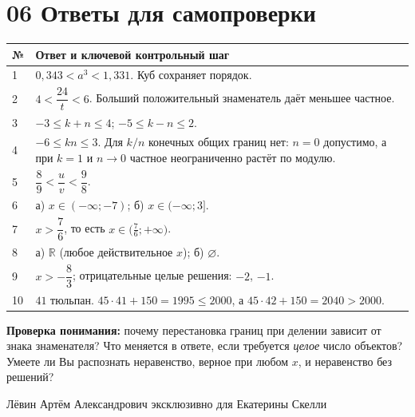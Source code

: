 \documentclass[a4paper,12pt]{article}
\newcommand{\key}[1]{\textbf{\textcolor{darkaccent}{#1}}}
\begin{document}
\section*{06 \quad Ответы для самопроверки}
\renewcommand{\arraystretch}{1.65}
\begin{tabularx}{\linewidth}{@{}p{1.05cm}X@{}}
\toprule
\textbf{№} & \textbf{Ответ и ключевой контрольный шаг}\\
\midrule
1 & $0{,}343<a^3<1{,}331$. Куб сохраняет порядок.\\
2 & $4<\dfrac{24}{t}<6$. Больший положительный знаменатель даёт меньшее частное.\\
3 & $-3\le k+n\le4$; \quad $-5\le k-n\le2$.\\
4 & $-6\le kn\le3$. Для $k/n$ конечных общих границ нет: $n=0$ допустимо, а при $k=1$ и $n\to0$ частное неограниченно растёт по модулю.\\
5 & $\dfrac89<\dfrac uv<\dfrac98$.\\
6 & а) $x\in(-\infty;-7)$; \quad б) $x\in(-\infty;3]$.\\
7 & $x>\dfrac76$, то есть $x\in\bigl(\frac76;+\infty\bigr)$.\\
8 & а) $\mathbb R$ (любое действительное $x$); \quad б) $\varnothing$.\\
9 & $x>-\dfrac83$; отрицательные целые решения: $-2$, $-1$.\\
10 & $41$ тюльпан. $45\cdot41+150=1995\le2000$, а $45\cdot42+150=2040>2000$.\\
\bottomrule
\end{tabularx}
\vspace{11mm}
\key{Проверка понимания:} почему перестановка границ при делении зависит от знака знаменателя? Что меняется в ответе, если требуется \emph{целое} число объектов? Умеете ли Вы распознать неравенство, верное при любом $x$, и неравенство без решений?

\vfill
\begin{center}
\small\color{muted} Лёвин Артём Александрович эксклюзивно для Екатерины Скелли
\end{center}
\end{document}
